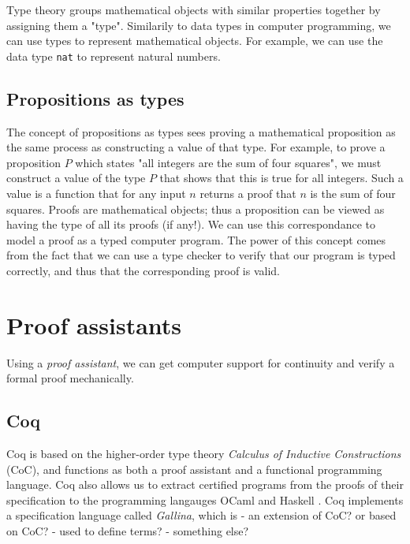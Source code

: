 Type theory groups mathematical objects with similar properties together by assigning them a "type".
Similarily to data types in computer programming, we can use types to represent mathematical
objects. For example, we can use the data type \texttt{nat} to represent natural numbers.

\subsection{Propositions as types}


The concept of propositions as types sees proving a mathematical proposition
as the same process as constructing a value of that type.
For example, to prove a proposition $P$ which states "all integers are the sum of four squares",
we must construct a value of the type $P$ that shows that this is true for all integers.
Such a value is a function that for any input $n$ returns a proof that $n$ is the sum of four squares.
Proofs are mathematical objects; thus a proposition can be viewed as having the type of all its proofs (if any!).
We can use this correspondance to model a proof as a typed computer program.
The power of this concept comes from the fact that we can use a type checker to verify that
our program is typed correctly, and thus that the corresponding proof is valid.

\section{Proof assistants}

Using a \textit{proof assistant}, we can get computer support for continuity and verify a formal proof mechanically.

\subsection{Coq}
Coq is based on the higher-order type theory \textit{Calculus of Inductive Constructions} (CoC), and
functions as both a proof assistant and a functional programming language.
Coq also allows us to extract certified programs from the proofs of their specification to
the programming langauges OCaml and Haskell \cite{cintro}.
Coq implements a specification language called \textit{Gallina}, which is
- an extension of CoC? or based on CoC?
- used to define terms?
- something else?

